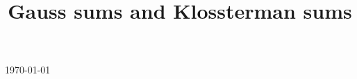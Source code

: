 

\title{Gauss sums and Klossterman sums}

\usepackage[sort=standard]{glossaries} 
\makeglossaries



\maketitle
\centerline{\today}
\tableofcontents







